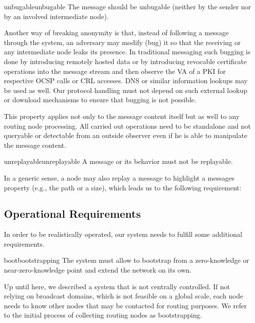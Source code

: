\begin{requirement}{unbugable}{unbugable}
	The message should be unbugable (neither by the sender nor by an involved intermediate node).
\end{requirement}

Another way of breaking anonymity is that, instead of following a message through the system, an adversary may modify (bug) it so that the receiving or any intermediate node leaks its presence. In traditional messaging such bugging is done by introducing remotely hosted data or by introducing revocable certificate operations into the message stream and then observe the VA of a PKI for respective OCSP calls or CRL accesses. DNS or similar information lookups may be used as well. Our protocol handling must not depend on such external lookup or download mechanisms to ensure that bugging is not possible.

This property applies not only to the message content itself but as well to any routing node processing. All carried out operations need to be standalone and not queryable or detectable from an outside observer even if he is able to manipulate the message content.

\begin{requirement}{unreplayable}{unreplayable}
	A message or its behavior must not be replayable.
\end{requirement}

In a generic sense, a node may also replay a message to highlight a messages property (e.g., the path or a size), which leads us to the following requirement:

\subsection{Operational Requirements}
In order to be realistically operated, our system needs to fulfill some additional requirements.

\begin{requirement}{boot}{bootstrapping}
	The system must allow to bootstrap from a zero-knowledge or near-zero-knowledge point and extend the network on its own. 
\end{requirement}
Up until here, we described a system that is not centrally controlled. If not relying on broadcast domains, which is not feasible on a global scale, each node needs to know other nodes that may be contacted for routing purposes. We refer to the initial process of collecting routing nodes as bootstrapping.

